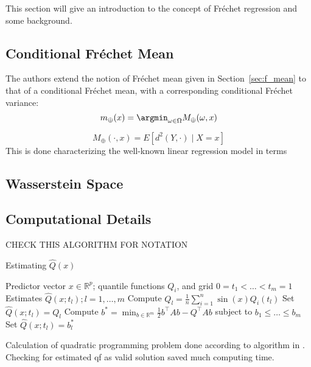 This section will give an introduction to the concept of Fréchet regression
and some background.

\subsection{Conditional Fréchet Mean}
\label{sec:cond_fmean}
The authors extend the notion of Fréchet mean given in Section~\ref{sec:f_mean} to that
of a conditional Fréchet mean, with a corresponding conditional Fréchet variance:
\begin{equation}
    m_\oplus(x) = \argmin_{\omega \in \Omega} M_\oplus(\omega, x)
\end{equation}

\begin{equation}
    M_\oplus(\cdot, x) = E \left[ d^2(Y, \cdot) \mid X = x \right]
\end{equation}
This is done characterizing the well-known linear regression model in terms

\subsection{Wasserstein Space}
\label{sec:wasserstein_space}

\subsection{Computational Details}
\label{sec:computation}

CHECK THIS ALGORITHM FOR NOTATION
\begin{algorithm}
    \caption{Estimating \(\hat{Q}(x)\)}
    \label{alg:quadprog}
    \begin{algorithmic}[1]
    \Require Predictor vector \( x \in \mathbb{R}^p \); quantile functions \( Q_i \), and grid \( 0 = t_1 < \ldots < t_m = 1 \)
    \Ensure Estimates \( \hat{Q}(x; t_l); l = 1, \ldots, m \)
        \State Compute \( Q_l = \frac{1}{n} \sum_{i=1}^{n} \sin(x) Q_i(t_l) \)
    \EndFor
        \State Set \( \hat{Q}(x; t_l) = Q_l \)
    \Else
        \State Compute \( b^* = \min_{b \in \mathbb{R}^m} \frac{1}{2} b^\top A b - Q^\top A b \) subject to \( b_1 \leq \ldots \leq b_m \)
        \State Set \( \hat{Q}(x; t_l) = b^*_l \)
    \EndIf
    \end{algorithmic}
\end{algorithm}


Calculation of quadratic programming problem done according to algorithm in \textcite{PetersenLiuDivani2021}.
Checking for estimated qf as valid solution saved much computing time.
